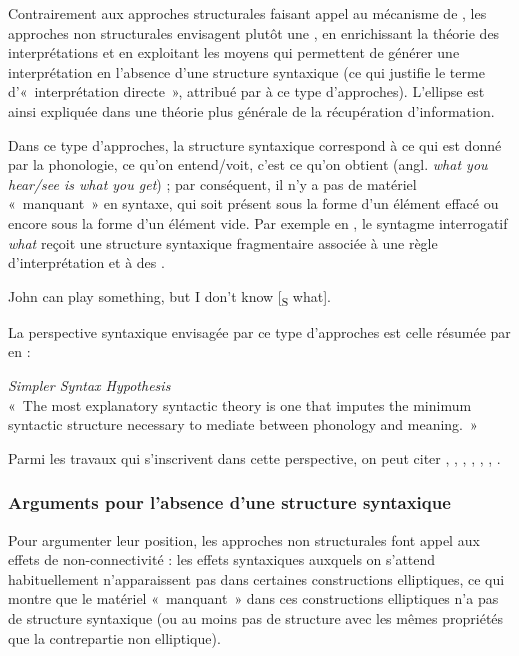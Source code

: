 Contrairement aux approches structurales faisant appel au mécanisme de , les approches non structurales envisagent plutôt une , en enrichissant la théorie des interprétations et en exploitant les moyens qui permettent de générer une interprétation en l’absence d’une structure syntaxique (ce qui justifie le terme d’«~interprétation directe~», attribué par \citealt{Merchant2004} à ce type d’approches). L’ellipse est ainsi expliquée dans une théorie plus générale de la récupération d’information.

Dans ce type d’approches, la structure syntaxique correspond à ce qui est donné par la phonologie, {\cad} ce qu’on entend/voit, c’est ce qu’on obtient (angl. \textit{what you hear/see is what you get}) ; par conséquent, il n’y a pas de matériel «~manquant~» en syntaxe, qui soit présent sous la forme d’un élément effacé ou encore sous la forme d’un élément vide. Par exemple en , le syntagme interrogatif\textit{ what} reçoit une structure syntaxique fragmentaire associée à une règle d’interprétation et à des .

\ea
John can play something, but I don’t know [\textsubscript{S} what]. \label{ch1:ex125}   
\z

\noindent La perspective syntaxique envisagée par ce type d’approches est celle résumée par \citet{CulicoverEtAl2005} en  :  

\ea \label{ch1:ex126}
\textit{Simpler Syntax Hypothesis} \citep[5]{CulicoverEtAl2005}\\ 
«~The most explanatory syntactic theory is one that imputes the minimum syntactic structure necessary to mediate between phonology and meaning.~»  
\z

Parmi les travaux qui s’inscrivent dans cette perspective, on peut citer \citet{SagEtAl1985}, \citet{Gardent1991}, \citet{DalrympleEtAl1991}, \citet{GinzburgEtAl2000}, \citet{Schlangen2003}, \citet{CulicoverEtAl2005}, \citet{Stainton2006}.


\subsubsection{Arguments pour l’absence d’une structure syntaxique}

Pour argumenter leur position, les approches non structurales font appel aux effets de non-connectivité : les effets syntaxiques auxquels on s’attend habituellement n’apparaissent pas dans certaines constructions elliptiques, ce qui montre que le matériel «~manquant~» dans ces constructions elliptiques n’a pas de structure syntaxique (ou au moins pas de structure avec les mêmes propriétés que la contrepartie non elliptique).

